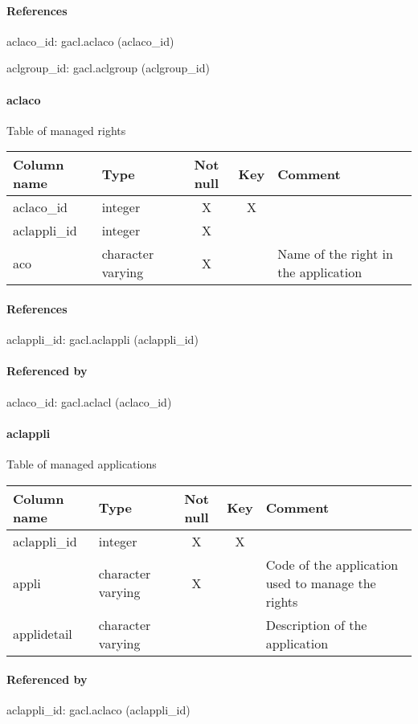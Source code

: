 \paragraph{References}
aclaco\_id: gacl.aclaco (aclaco\_id)

aclgroup\_id: gacl.aclgroup (aclgroup\_id)

\paragraph{aclaco}
Table of managed rights

\begin{tabular}{|l| p{2cm}|c|c| p{5cm}|}
\hline
Column name & Type & Not null & Key & Comment \\
\hline
aclaco\_id & integer & X & X & \\
aclappli\_id & integer & X &  & \\
aco & character varying & X &  & Name of the right in the application\\
\hline
\end{tabular}
\paragraph{References}
aclappli\_id: gacl.aclappli (aclappli\_id)

\paragraph{Referenced by}
aclaco\_id: gacl.aclacl (aclaco\_id)

\paragraph{aclappli}
Table of managed applications

\begin{tabular}{|l| p{2cm}|c|c| p{5cm}|}
\hline
Column name & Type & Not null & Key & Comment \\
\hline
aclappli\_id & integer & X & X & \\
appli & character varying & X &  & Code of the application used to manage the rights\\
applidetail & character varying &  &  & Description of the application\\
\hline
\end{tabular}
\paragraph{Referenced by}
aclappli\_id: gacl.aclaco (aclappli\_id)

